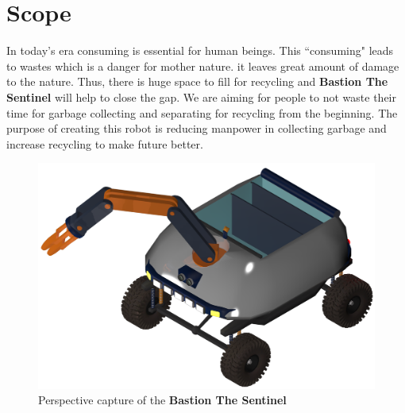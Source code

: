\documentclass[12pt,a4paper]{article}
\begin{document}
\section{Scope}
 \begin{flushleft}
  In today's era consuming is essential for human beings. This ``consuming" leads to wastes which is a danger for mother nature. 
  it leaves great amount of damage 
  to the nature. Thus, there is huge space to fill for recycling 
  and \textbf{Bastion The Sentinel} will help to close the gap. We are aiming for people to not waste their time for garbage 
  collecting and separating for recycling from the beginning. The purpose of creating this robot is reducing manpower in 
  collecting garbage and increase recycling to make future better.
  \begin{figure}[h]
   \begin{center}
    \includegraphics[scale=0.2]{perspective_box_open}
    \caption{Perspective capture of the \textbf{Bastion The Sentinel}}
   \end{center}
  \end{figure}
 \end{flushleft}
  
\end{document}
